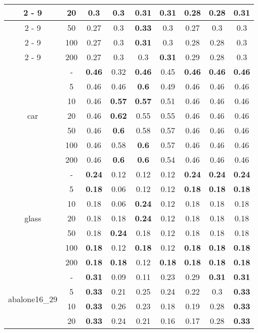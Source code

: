\documentclass{article}%
\begin{document}
\begin{longtable}{c|c|ccccccc}
\cline{2%
-%
9}%
&20&0.3&0.3&\textbf{0.31}&\textbf{0.31}&0.28&0.28&\textbf{0.31}\\%
\cline{2%
-%
9}%
&50&0.27&0.3&\textbf{0.33}&0.3&0.27&0.3&0.3\\%
\cline{2%
-%
9}%
&100&0.27&0.3&\textbf{0.31}&0.3&0.28&0.28&0.3\\%
\cline{2%
-%
9}%
&200&0.27&0.3&0.3&\textbf{0.31}&0.29&0.28&0.3\\%
\hline%
\multirow{7}{*}{car}&{-}&\textbf{0.46}&0.32&\textbf{0.46}&0.45&\textbf{0.46}&\textbf{0.46}&\textbf{0.46}\\%
\cline{2%
-%
9}%
&5&0.46&0.46&\textbf{0.6}&0.49&0.46&0.46&0.46\\%
\cline{2%
-%
9}%
&10&0.46&\textbf{0.57}&\textbf{0.57}&0.51&0.46&0.46&0.46\\%
\cline{2%
-%
9}%
&20&0.46&\textbf{0.62}&0.55&0.55&0.46&0.46&0.46\\%
\cline{2%
-%
9}%
&50&0.46&\textbf{0.6}&0.58&0.57&0.46&0.46&0.46\\%
\cline{2%
-%
9}%
&100&0.46&0.58&\textbf{0.6}&0.57&0.46&0.46&0.46\\%
\cline{2%
-%
9}%
&200&0.46&\textbf{0.6}&\textbf{0.6}&0.54&0.46&0.46&0.46\\%
\hline%
\multirow{7}{*}{glass}&{-}&\textbf{0.24}&0.12&0.12&0.12&\textbf{0.24}&\textbf{0.24}&\textbf{0.24}\\%
\cline{2%
-%
9}%
&5&\textbf{0.18}&0.06&0.12&0.12&\textbf{0.18}&\textbf{0.18}&\textbf{0.18}\\%
\cline{2%
-%
9}%
&10&0.18&0.06&\textbf{0.24}&0.12&0.18&0.18&0.18\\%
\cline{2%
-%
9}%
&20&0.18&0.18&\textbf{0.24}&0.12&0.18&0.18&0.18\\%
\cline{2%
-%
9}%
&50&0.18&\textbf{0.24}&0.18&0.12&0.18&0.18&0.18\\%
\cline{2%
-%
9}%
&100&\textbf{0.18}&0.12&\textbf{0.18}&0.12&\textbf{0.18}&\textbf{0.18}&\textbf{0.18}\\%
\cline{2%
-%
9}%
&200&\textbf{0.18}&\textbf{0.18}&0.12&\textbf{0.18}&\textbf{0.18}&\textbf{0.18}&\textbf{0.18}\\%
\hline%
\multirow{7}{*}{abalone16\_29}&{-}&\textbf{0.31}&0.09&0.11&0.23&0.29&\textbf{0.31}&\textbf{0.31}\\%
\cline{2%
-%
9}%
&5&\textbf{0.33}&0.21&0.25&0.24&0.22&0.3&\textbf{0.33}\\%
\cline{2%
-%
9}%
&10&\textbf{0.33}&0.26&0.23&0.18&0.19&0.28&\textbf{0.33}\\%
\cline{2%
-%
9}%
&20&\textbf{0.33}&0.24&0.21&0.16&0.17&0.28&\textbf{0.33}\\%

\end{longtable}
\end{document}
